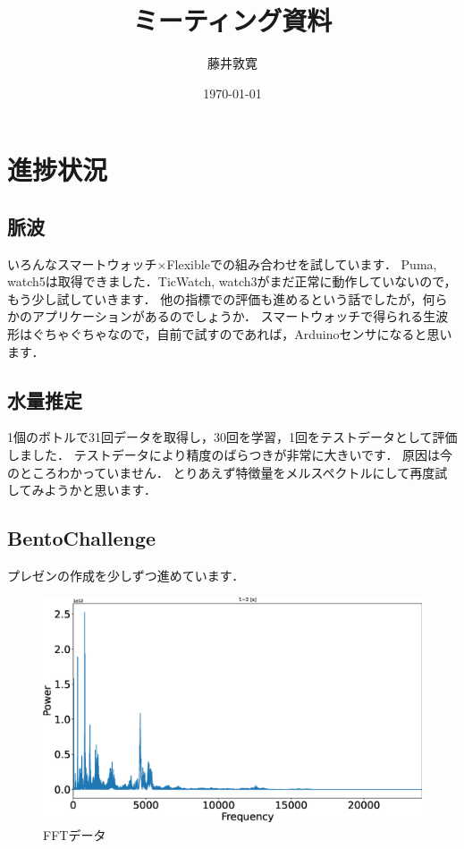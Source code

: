 \documentclass[a4j,10pt]{jarticle}
\title{ミーティング資料}
\author{藤井敦寛}
\date{\today}
\begin{document}
\maketitle

\section{進捗状況}

\subsection{脈波}
いろんなスマートウォッチ×Flexibleでの組み合わせを試しています．
Puma, watch5は取得できました．TicWatch, watch3がまだ正常に動作していないので，もう少し試していきます．
他の指標での評価も進めるという話でしたが，何らかのアプリケーションがあるのでしょうか．
スマートウォッチで得られる生波形はぐちゃぐちゃなので，自前で試すのであれば，Arduinoセンサになると思います．

\subsection{水量推定}
1個のボトルで31回データを取得し，30回を学習，1回をテストデータとして評価しました．
テストデータにより精度のばらつきが非常に大きいです．
原因は今のところわかっていません．
とりあえず特徴量をメルスペクトルにして再度試してみようかと思います．

\subsection{BentoChallenge}
プレゼンの作成を少しずつ進めています．


\begin{figure}[h]
  \begin{center}
    \includegraphics[width=1\textwidth]{1.eps}
    \caption{FFTデータ}
  \end{center}
\end{figure}
\end{document}
